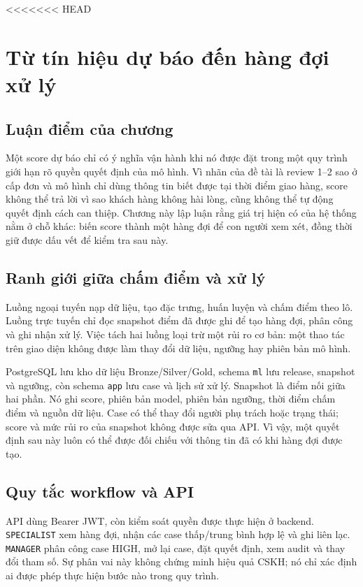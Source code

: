 <<<<<<< HEAD
\chapter{Từ tín hiệu dự báo đến hàng đợi xử lý}\label{ch:system-experiment}

\section{Luận điểm của chương}

Một score dự báo chỉ có ý nghĩa vận hành khi nó được đặt trong một quy trình giới hạn rõ quyền quyết định của mô hình. Vì nhãn của đề tài là review 1--2 sao ở cấp đơn và mô hình chỉ dùng thông tin biết được tại thời điểm giao hàng, score không thể trả lời vì sao khách hàng không hài lòng, cũng không thể tự động quyết định cách can thiệp. Chương này lập luận rằng giá trị hiện có của hệ thống nằm ở chỗ khác: biến score thành một hàng đợi để con người xem xét, đồng thời giữ được dấu vết để kiểm tra sau này.

\section{Ranh giới giữa chấm điểm và xử lý}

Luồng ngoại tuyến nạp dữ liệu, tạo đặc trưng, huấn luyện và chấm điểm theo lô. Luồng trực tuyến chỉ đọc snapshot điểm đã được ghi để tạo hàng đợi, phân công và ghi nhận xử lý. Việc tách hai luồng loại trừ một rủi ro cơ bản: một thao tác trên giao diện không được làm thay đổi dữ liệu, ngưỡng hay phiên bản mô hình.

PostgreSQL lưu kho dữ liệu Bronze/Silver/Gold, schema \texttt{ml} lưu release, snapshot và ngưỡng, còn schema \texttt{app} lưu case và lịch sử xử lý. Snapshot là điểm nối giữa hai phần. Nó ghi score, phiên bản model, phiên bản ngưỡng, thời điểm chấm điểm và nguồn dữ liệu. Case có thể thay đổi người phụ trách hoặc trạng thái; score và mức rủi ro của snapshot không được sửa qua API. Vì vậy, một quyết định sau này luôn có thể được đối chiếu với thông tin đã có khi hàng đợi được tạo.

\section{Quy tắc workflow và API}\label{sec:system-api}

API dùng Bearer JWT, còn kiểm soát quyền được thực hiện ở backend. \texttt{SPECIALIST} xem hàng đợi, nhận các case thấp/trung bình hợp lệ và ghi liên lạc. \texttt{MANAGER} phân công case HIGH, mở lại case, đặt quyết định, xem audit và thay đổi tham số. Sự phân vai này không chứng minh hiệu quả CSKH; nó chỉ xác định ai được phép thực hiện bước nào trong quy trình.

